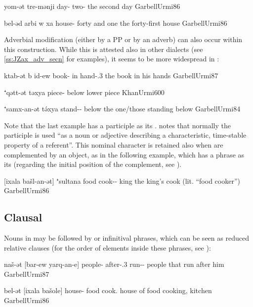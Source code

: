 {yom-ət tre-mənji}
{day-\cst{} two-\ord}
{the second day}
{GarbellUrmi}{86}

{bel-əd arbi \cb{}w xa}
{house-\cst{} forty \cb{}and one}
{the forty-first house}
{GarbellUrmi}{86}

Adverbial modification (either by a PP or by an adverb) can also occur within this construction. While this is attested also in other dialects (see \vref{ss:JZax_adv_secn} for \JZax examples), it seems to be more widespread in \JUrm:

{ktab-ət b\cb{} id-ew}
{book-\cst{} in\cb{} hand-\poss.3\masc}
{the book in his hands}
{GarbellUrmi}{87}

{⁺qətt-ət təxya}
{piece-\cst{} below}
{lower piece}
{KhanUrmi}{600}

{⁺samx-an-ət tə́xya}
{stand-\ptcp-\cst{} below}
{the one/those standing below}
{GarbellUrmi}{84}

Note that the last example has a participle as its \prim. \citet[78]{KhanUrmi} notes that normally the participle is used \enquote{as a noun or adjective describing a characteristic, time-stable property of a referent}. This nominal character is retained also when  are complemented by an object, as in the following example, which has a  phrase as its \prim (regarding the initial position of the complement, see ).

{[ixala bašl-an-ət] ⁺sultana}
{food cook-\ptcp-\cst{} king}
{the king's cook (lit. \enquote{food cooker})}
{GarbellUrmi}{86}

\subsection{Clausal \secns}

Nouns in \cst* may be followed by  or infinitival phrases, which can be seen as reduced relative clauses (for the order of elements inside these phrases, see  ):

{naš-ət [bar-ew yarq-an-e]}
{people-\cst{} after-\poss.3\masc{} run-\ptcp-\pl}
{people that run after him}
{GarbellUrmi}{87}


{bel-ət [ixala bašole]}
{house-\cst{} food cook.\inf}
{house of food cooking, kitchen}
{GarbellUrmi}{86}

